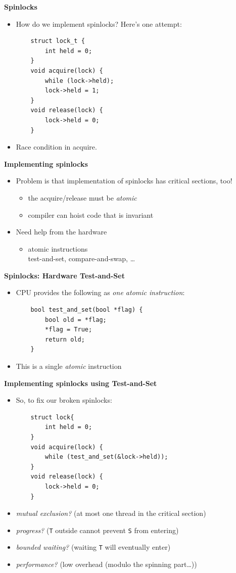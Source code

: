 \documentclass[11pt,a4paper]{article}
\begin{document}
\textbf{Spinlocks}
\begin{itemize}
    \item How do we implement spinlocks?
        Here's one attempt:
        \begin{verbatim}
    struct lock_t {
        int held = 0;
    }
    void acquire(lock) {
        while (lock->held);
        lock->held = 1;
    }
    void release(lock) {
        lock->held = 0;
    }
        \end{verbatim}
    \item Race condition in acquire.
\end{itemize}

\textbf{Implementing spinlocks}
\begin{itemize}
    \item Problem is that implementation of spinlocks has critical sections, too!
        \begin{itemize}
            \item the acquire/release must be \emph{atomic}
            \item compiler can hoist code that is invariant
        \end{itemize}
    \item Need help from the hardware
        \begin{itemize}
            \item atomic instructions \\
                test-and-set, compare-and-swap, \dots
        \end{itemize}
\end{itemize}

\textbf{Spinlocks: Hardware Test-and-Set}
\begin{itemize}
    \item CPU provides the following as \emph{one atomic instruction}:
        \begin{verbatim}
    bool test_and_set(bool *flag) {
        bool old = *flag;
        *flag = True;
        return old;
    }
        \end{verbatim}
    \item This is a single \emph{atomic} instruction
\end{itemize}

\textbf{Implementing spinlocks using Test-and-Set}
\begin{itemize}
    \item So, to fix our broken spinlocks:
        \begin{verbatim}
    struct lock{
        int held = 0;
    }
    void acquire(lock) {
        while (test_and_set(&lock->held));
    }
    void release(lock) {
        lock->held = 0;
    }
    \end{verbatim}
\item \emph{mutual exclusion?} (at most one thread in the critical section)
\item \emph{progress?} (\texttt{T} outside cannot prevent \texttt{S} from entering)
\item \emph{bounded waiting?} (waiting \texttt{T} will eventually enter)
\item \emph{performance?} (low overhead (modulo the spinning part\dots))
\end{itemize}
\end{document}
